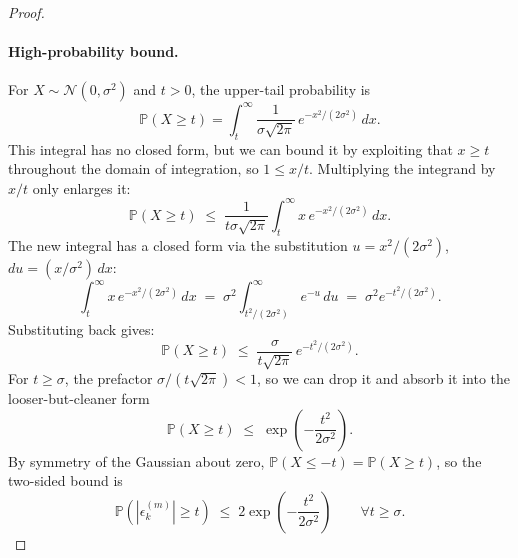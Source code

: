 \documentclass{article}
\begin{document}
\begin{proof}
\paragraph{High-probability bound.}
For $X \sim \mathcal{N}(0, \sigma^2)$ and $t > 0$, the upper-tail probability is
\begin{equation*}
\mathbb{P}(X \geq t) = \int_t^\infty \frac{1}{\sigma\sqrt{2\pi}}\, e^{-x^2/(2\sigma^2)}\, dx.
\end{equation*}
This integral has no closed form, but we can bound it by exploiting that $x \geq t$ throughout the domain of integration, so $1 \leq x/t$. Multiplying the integrand by $x/t$ only enlarges it:
\begin{equation*}
\mathbb{P}(X \geq t) \;\leq\; \frac{1}{t\sigma\sqrt{2\pi}} \int_t^\infty x\, e^{-x^2/(2\sigma^2)}\, dx.
\end{equation*}
The new integral has a closed form via the substitution $u = x^2/(2\sigma^2)$, $du = (x/\sigma^2)\,dx$:
\begin{equation*}
\int_t^\infty x\, e^{-x^2/(2\sigma^2)}\, dx 
\;=\; \sigma^2 \int_{t^2/(2\sigma^2)}^\infty e^{-u}\, du 
\;=\; \sigma^2 e^{-t^2/(2\sigma^2)}.
\end{equation*}
Substituting back gives:
\begin{equation*}
\mathbb{P}(X \geq t) \;\leq\; \frac{\sigma}{t\sqrt{2\pi}}\, e^{-t^2/(2\sigma^2)}.
\end{equation*}
For $t \geq \sigma$, the prefactor $\sigma/(t\sqrt{2\pi}) < 1$, so we can drop it and absorb it into the looser-but-cleaner form
\begin{equation*}
\mathbb{P}(X \geq t) \;\leq\; \exp\!\left(-\frac{t^2}{2\sigma^2}\right).
\end{equation*}
By symmetry of the Gaussian about zero, $\mathbb{P}(X \leq -t) = \mathbb{P}(X \geq t)$, so the two-sided bound is
\begin{equation}
\mathbb{P}(|\epsilon_k^{(m)}| \geq t) \;\leq\; 2\exp\!\left(-\frac{t^2}{2\sigma^2}\right) \qquad \forall t \geq \sigma.
\label{eq:gaussian-tail}
\end{equation}


\end{proof}
\end{document}
